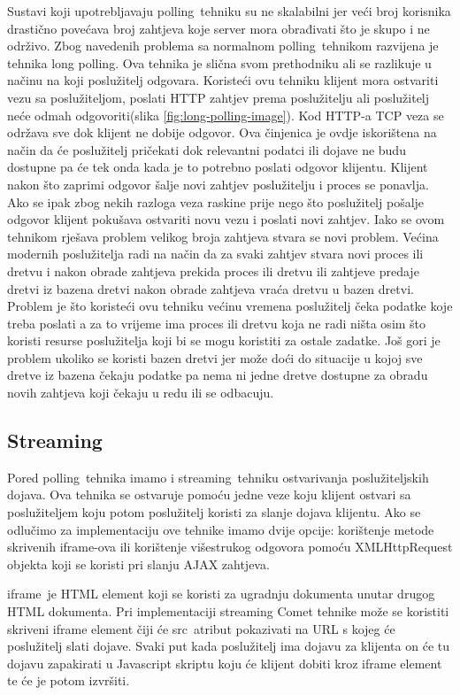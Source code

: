 \documentclass[times, utf8, zavrsni]{fer}
\begin{document}
Sustavi koji upotrebljavaju \glqq polling\grqq\  tehniku su ne skalabilni jer veći broj korisnika drastično povećava broj zahtjeva koje server mora obrađivati što je skupo i ne održivo. Zbog navedenih problema sa normalnom \glqq polling\grqq\  tehnikom razvijena je tehnika \glqq long polling\grqq . Ova tehnika je slična svom prethodniku ali se razlikuje u načinu na koji poslužitelj odgovara. Koristeći ovu tehniku klijent mora ostvariti vezu sa poslužiteljom, poslati HTTP zahtjev prema poslužitelju ali poslužitelj neće odmah odgovoriti(slika \ref{fig:long-polling-image}). Kod HTTP-a TCP veza se održava sve dok klijent ne dobije odgovor. Ova činjenica je ovdje iskorištena na način da će poslužitelj pričekati dok relevantni podatci ili dojave ne budu dostupne pa će tek onda kada je to potrebno poslati odgovor klijentu. Klijent nakon što zaprimi odgovor šalje novi zahtjev poslužitelju i proces se ponavlja. Ako se ipak zbog nekih razloga veza raskine prije nego što poslužitelj pošalje odgovor klijent pokušava ostvariti novu vezu i poslati novi zahtjev. Iako se ovom tehnikom rješava problem velikog broja zahtjeva stvara se novi problem. Većina modernih poslužitelja radi na način da za svaki zahtjev stvara novi proces ili dretvu i nakon obrade zahtjeva prekida proces ili dretvu ili zahtjeve predaje dretvi iz bazena dretvi nakon obrade zahtjeva  vraća dretvu u bazen dretvi. Problem je što koristeći ovu tehniku većinu vremena poslužitelj čeka podatke koje treba poslati a za to vrijeme ima proces ili dretvu koja ne radi ništa osim što koristi resurse poslužitelja koji bi se mogu koristiti za ostale zadatke. Još gori je problem ukoliko se koristi bazen dretvi jer može doći do situacije u kojoj sve dretve iz bazena čekaju podatke pa nema ni jedne dretve dostupne za obradu novih zahtjeva koji čekaju u redu ili se odbacuju.

\subsection{Streaming}
Pored \glqq polling\grqq\  tehnika imamo i \glqq streaming\grqq\  tehniku ostvarivanja poslužiteljskih dojava. Ova tehnika se ostvaruje pomoću jedne veze koju klijent ostvari sa poslužiteljem koju potom poslužitelj koristi za slanje dojava klijentu. Ako se odlučimo za implementaciju ove tehnike imamo dvije opcije: korištenje metode skrivenih iframe-ova ili korištenje višestrukog odgovora pomoću XMLHttpRequest objekta koji se koristi pri slanju AJAX zahtjeva.

\glqq iframe\grqq\  je HTML element koji se koristi za ugradnju dokumenta unutar drugog HTML dokumenta. Pri implementaciji streaming Comet tehnike može se koristiti skriveni iframe element čiji će \glqq src\grqq\  atribut pokazivati na URL s kojeg će poslužitelj slati dojave. Svaki put kada poslužitelj ima dojavu za klijenta on će tu dojavu zapakirati u Javascript skriptu koju će klijent dobiti kroz iframe element te će je potom izvršiti.\citep{carbou2011}
\end{document}

